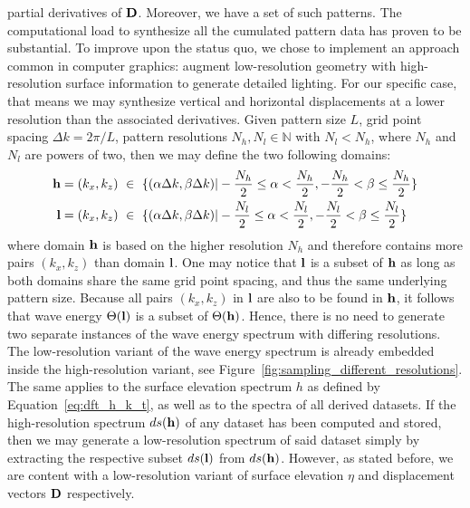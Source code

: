 partial derivatives of $\mathbf{D}$. Moreover, we have a set of such patterns. The
computational load to synthesize all the cumulated pattern data has proven to be
substantial. To improve upon the status quo, we chose to implement an approach
common in computer graphics: augment low-resolution geometry with high-resolution
surface information to generate detailed lighting. For our specific case, that
means we may synthesize vertical and horizontal displacements at a lower
resolution than the associated derivatives.
%
%
Given pattern size $L$, grid point spacing $\Delta k = 2\pi/L$, pattern
resolutions $N_h,N_l \in \mathbb{N}$ with $N_l < N_h$, where $N_h$ and $N_l$ are
powers of two, then we may define the two following \wavevector domains:
%
\begin{align}
\mathbf{h} = (k_x,k_z)~&\in~\{(\alpha\Delta k,\beta\Delta k)|-\frac{N_h}{2}\leq\alpha<\frac{N_h}{2},-\frac{N_h}{2}<\beta\leq\frac{N_h}{2}\}\\
\mathbf{l} = (k_x,k_z)~&\in~\{(\alpha\Delta k,\beta\Delta k)|-\frac{N_l}{2}\leq\alpha<\frac{N_l}{2},-\frac{N_l}{2}<\beta\leq\frac{N_l}{2}\}
\end{align}
where \wavevector domain $\mathbf{h}$ is based on the higher resolution $N_h$ and therefore contains
more pairs $(k_x, k_z)$ than \wavevector domain $\mathbf{l}$. One may notice that $\mathbf{l}$ is a
subset of $\mathbf{h}$ as long as both \wavevector domains share the same grid point
spacing, and thus the same underlying pattern size. Because all pairs $(k_x, k_z)$ in $\mathbf{l}$ are also to be found
in $\mathbf{h}$, it follows that wave energy $\Theta(\mathbf{l})$ is a subset of
$\Theta(\mathbf{h})$. Hence, there is no need to generate two separate instances
of the wave energy spectrum with differing resolutions.
The low-resolution variant of the wave energy spectrum is already embedded inside the
high-resolution variant, see Figure~\ref{fig:sampling_different_resolutions}.
The same applies to the surface elevation spectrum $h$ as defined
by Equation~\ref{eq:dft_h_k_t}, as well as to the spectra of all derived datasets.
If the high-resolution spectrum $ds(\mathbf{h})$ of any dataset has been computed and stored,
then we may generate a low-resolution spectrum of said dataset simply by extracting
the respective subset $ds(\mathbf{l})$ from $ds(\mathbf{h})$. However, as stated before,
we are content with a low-resolution variant of surface elevation $\eta$ and
displacement vectors $\mathbf{D}$ respectively.

